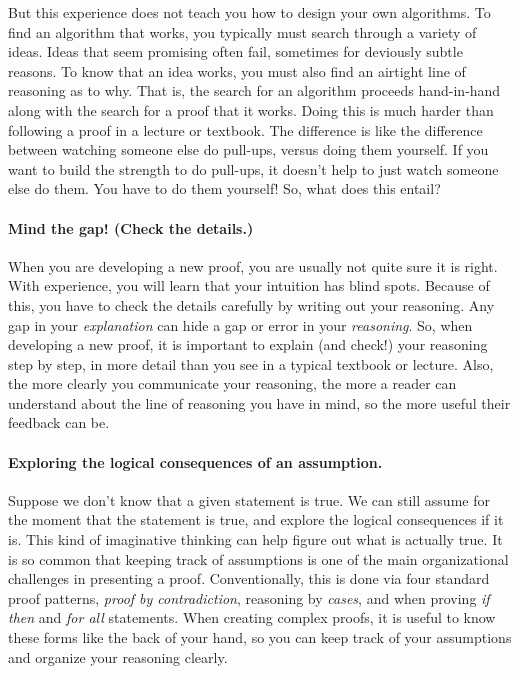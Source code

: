 But this experience does not teach you how to design your own algorithms.
To find an algorithm that works, you typically must search through a variety of ideas.
Ideas that seem promising often fail, sometimes for deviously subtle reasons.
To know that an idea works, you must also find an airtight line of reasoning as to why.
That is, the search for an algorithm proceeds hand-in-hand along with the search for a proof that it works.
Doing this is much harder than following a proof in a lecture or textbook.
The difference is like the difference between watching someone else do pull-ups,
versus doing them yourself.
If you want to build the strength to do pull-ups, it doesn't help to just watch someone else do them.
You have to do them yourself!
So, what does this entail?

\paragraph{Mind the gap!  (Check the details.)}
When you are developing a new proof, you are usually not quite sure it is right.
With experience, you will learn that your intuition has blind spots. 
Because of this, you have to check the details carefully by writing out your reasoning.
Any gap in your \emph{explanation} can hide a gap or error in your \emph{reasoning}.
So, when developing a new proof,
it is important to explain (and check!) your reasoning step by step,
in more detail than you see in a typical textbook or lecture.
Also, the more clearly you communicate your reasoning,
the more a reader can understand about the line of reasoning you have in mind,
so the more useful their feedback can be.

\paragraph{Exploring the logical consequences of an assumption.}
Suppose we don't know that a given statement is true.
We can still assume for the moment that the statement is true, and explore the logical consequences if it is.
This kind of imaginative thinking can help figure out what is actually true.
It is so common that keeping track of assumptions
is one of the main organizational challenges in presenting a proof.
Conventionally, this is done via four standard proof patterns,
\emph{proof by contradiction}, reasoning by \emph{cases},
and when proving \emph{if then} and \emph{for all} statements.
When creating complex proofs, it is useful to know these forms
like the back of your hand, so you can keep track of your assumptions
and organize your reasoning clearly.

